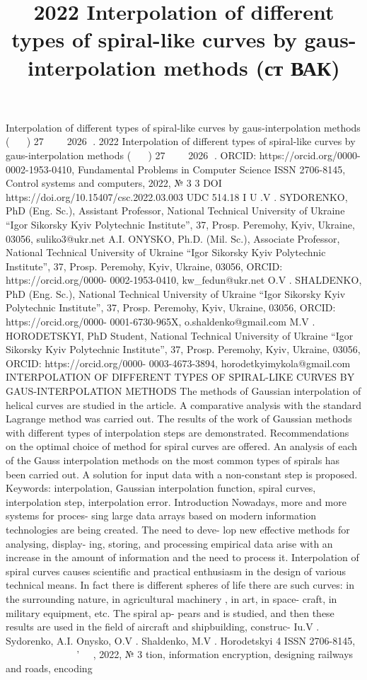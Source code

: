 \documentclass[12pt,a4paper]{article}
\begin{document}
\title{2022 Interpolation of different types of spiral-like curves by gaus-interpolation methods (ст ВАК)}
 Interpolation of different types of spiral-like curves by gaus-interpolation methods (￿￿ ￿￿￿) 27 ￿￿￿￿￿￿ 2026 ￿. 2022 Interpolation of different types of spiral-like curves by gaus-interpolation methods (￿￿ ￿￿￿) 27 ￿￿￿￿￿￿ 2026 ￿. ORCID: https://orcid.org/0000-0002-1953-0410, Fundamental Problems in Computer Science ISSN 2706-8145, Control systems and computers, 2022, № 3 3 DOI https://doi.org/10.15407/csc.2022.03.003 UDC 514.18 I U .V . SYDORENKO, PhD (Eng. Sc.), Assistant Professor, National Technical University of Ukraine “Igor Sikorsky Kyiv Polytechnic Institute”, 37, Prosp. Peremohy, Kyiv, Ukraine, 03056, suliko3@ukr.net A.I. ONYSKO, Ph.D. (Mil. Sc.), Associate Professor, National Technical University of Ukraine “Igor Sikorsky Kyiv Polytechnic Institute”, 37, Prosp. Peremohy, Kyiv, Ukraine, 03056, ORCID: https://orcid.org/0000- 0002-1953-0410, kw\_fedun@ukr.net O.V . SHALDENKO, PhD (Eng. Sc.), National Technical University of Ukraine “Igor Sikorsky Kyiv Polytechnic Institute”, 37, Prosp. Peremohy, Kyiv, Ukraine, 03056, ORCID: https://orcid.org/0000- 0001-6730-965X, o.shaldenko@gmail.com M.V . HORODETSKYI, PhD Student, National Technical University of Ukraine “Igor Sikorsky Kyiv Polytechnic Institute”, 37, Prosp. Peremohy, Kyiv, Ukraine, 03056, ORCID: https://orcid.org/0000- 0003-4673-3894, horodetkyimykola@gmail.com INTERPOLATION OF DIFFERENT TYPES OF SPIRAL-LIKE CURVES BY GAUS-INTERPOLATION METHODS The methods of Gaussian interpolation of helical curves are studied in the article. A comparative analysis with the standard Lagrange method was carried out. The results of the work of Gaussian methods with different types of interpolation steps are demonstrated. Recommendations on the optimal choice of method for spiral curves are offered. An analysis of each of the Gauss interpolation methods on the most common types of spirals has been carried out. A solution for input data with a non-constant step is proposed. Keywords: interpolation, Gaussian interpolation function, spiral curves, interpolation step, interpolation error. Introduction Nowadays, more and more systems for proces- sing large data arrays based on modern information technologies are being created. The need to deve- lop new effective methods for analysing, display- ing, storing, and processing empirical data arise with an increase in the amount of information and the need to process it. Interpolation of spiral curves causes scientific and practical enthusiasm in the design of various technical means. In fact there is different spheres of life there are such curves: in the surrounding nature, in agricultural machinery , in art, in space- craft, in military equipment, etc. The spiral ap- pears and is studied, and then these results are used in the field of aircraft and shipbuilding, construc- Iu.V . Sydorenko, A.I. Onysko, O.V . Shaldenko, M.V . Horodetskyi 4 ISSN 2706-8145, ￿￿￿￿￿￿￿ ￿￿￿￿￿￿￿￿￿ ￿￿ ￿￿￿￿'￿￿￿￿￿, 2022, № 3 tion, information encryption, designing railways and roads, encoding 
\end{document}
